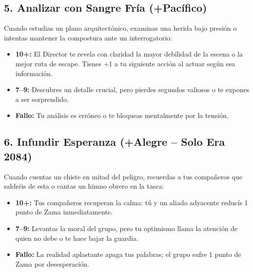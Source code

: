 \subsection{5. Analizar con Sangre Fría (+Pacífico)}
Cuando estudias un plano arquitectónico, examinas una herida bajo presión o intentas mantener la compostura ante un interrogatorio:
\begin{itemize}
  \item \textbf{10+:} El Director te revela con claridad la mayor debilidad de la escena o la mejor ruta de escape. Tienes +1 a tu siguiente acción al actuar según esa información.
  \item \textbf{7--9:} Descubres un detalle crucial, pero pierdes segundos valiosos o te expones a ser sorprendido.
  \item \textbf{Fallo:} Tu análisis es erróneo o te bloqueas mentalmente por la tensión.
\end{itemize}

\subsection{6. Infundir Esperanza (+Alegre -- Solo Era 2084)}
Cuando cuentas un chiste en mitad del peligro, recuerdas a tus compañeros que saldréis de esta o cantas un himno obrero en la tasca:
\begin{itemize}
  \item \textbf{10+:} Tus compañeros recuperan la calma: tú y un aliado adyacente reducís 1 punto de Zama inmediatamente.
  \item \textbf{7--9:} Levantas la moral del grupo, pero tu optimismo llama la atención de quien no debe o te hace bajar la guardia.
  \item \textbf{Fallo:} La realidad aplastante apaga tus palabras; el grupo sufre 1 punto de Zama por desesperación.
\end{itemize}
